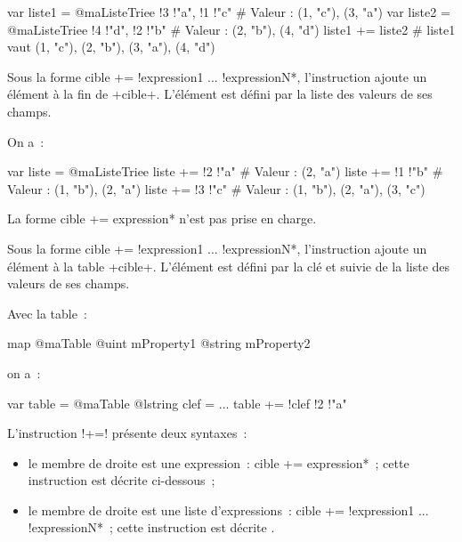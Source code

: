 \begin{galgas}
var liste1 = @maListeTriee {!3 !"a", !1 !"c"} # Valeur : (1, "c"), (3, "a")
var liste2 = @maListeTriee {!4 !"d", !2 !"b"} # Valeur : (2, "b"), (4, "d")
liste1 += liste2 # liste1 vaut (1, "c"), (2, "b"), (3, "a"), (4, "d")
\end{galgas}



Sous la forme \ggs*cible += !expression1 ... !expressionN*, l'instruction ajoute un élément à la fin de \ggs+cible+. L'élément est défini par la liste des valeurs de ses champs.


On a~:

\begin{galgas}
var liste = @maListeTriee {}
liste += !2 !"a" # Valeur : (2, "a")
liste += !1 !"b" # Valeur : (1, "b"), (2, "a")
liste += !3 !"c" # Valeur : (1, "b"), (2, "a"), (3, "c")
\end{galgas}








La forme \ggs*cible += expression* n'est pas prise en charge.

Sous la forme \ggs*cible += !expression1 ... !expressionN*, l'instruction ajoute un élément à la table \ggs+cible+. L'élément est défini par la clé et suivie de la liste des valeurs de ses champs.


Avec la table~:
\begin{galgas}
map @maTable {
  @uint mProperty1
  @string mProperty2
}
\end{galgas}

on a~:

\begin{galgas}
var table = @maTable {}
@lstring clef = ...
table += !clef !2 !"a"
\end{galgas}















L'instruction \ggs!+=! présente deux syntaxes~:
\begin{itemize}
  \item le membre de droite est une expression~: \ggs*cible += expression*~; cette instruction est décrite ci-dessous~;
  \item le membre de droite est une liste d'expressions~: \ggs*cible += !expression1 ... !expressionN*~; cette instruction est décrite .
\end{itemize}

